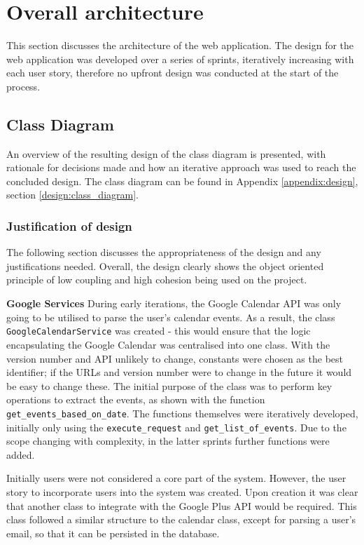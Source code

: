 \section{Overall architecture}
This section discusses the architecture of the web application. The design for the web application was developed over a series of sprints, iteratively increasing with each user story, therefore no upfront design was conducted at the start of the process.

\subsection{Class Diagram}
\label{architecture:class}
An overview of the resulting design of the class diagram is presented, with rationale for decisions made and how an iterative approach was used to reach the concluded design. The class diagram can be found in Appendix \ref{appendix:design}, section \ref{design:class_diagram}.

\subsubsection{Justification of design}
The following section discusses the appropriateness of the design and any justifications needed. Overall, the design clearly shows the object oriented principle of low coupling and high cohesion being used on the project.

\noindent
\textbf{Google Services}
\newline
During early iterations, the Google Calendar API \cite{citeulike:14027125} was only going to be utilised to parse the user's calendar events. As a result, the class \texttt{GoogleCalendarService} was created - this would ensure that the logic encapsulating the Google Calendar was centralised into one class. With the version number and API unlikely to change, constants were chosen as the best identifier; if the URLs and version number were to change in the future it would be easy to change these. The initial purpose of the class was to perform key operations to extract the events, as shown with the function \texttt{get\_events\_based\_on\_date}. The functions themselves were iteratively developed, initially only using the \texttt{execute\_request} and \texttt{get\_list\_of\_events}. Due to the scope changing with complexity, in the latter sprints  further functions were added.

Initially users were not considered a core part of the system. However, the user story to incorporate users into the system was created. Upon creation it was clear that another class to integrate with the Google Plus API \cite{citeulike:14027127} would be required. This class followed a similar structure to the calendar class, except for parsing a user's email, so that it can be persisted in the database.

